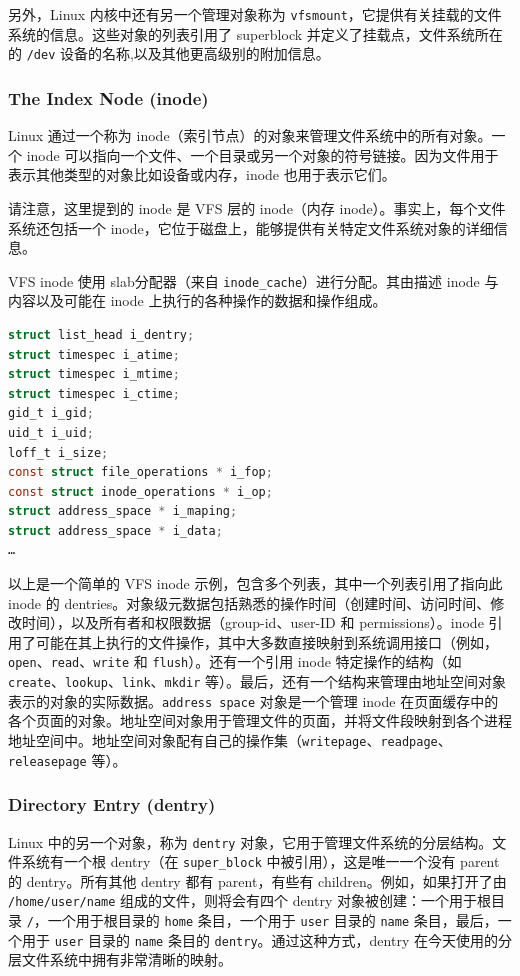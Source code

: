 \documentclass[UTF8,a4paper]{ctexart}
\begin{document}
另外，Linux 内核中还有另一个管理对象称为
\texttt{vfsmount}，它提供有关挂载的文件系统的信息。这些对象的列表引用了
superblock 并定义了挂载点，文件系统所在的 \texttt{/dev}
设备的名称,以及其他更高级别的附加信息。


\subsubsection{The Index Node (inode)}
Linux 通过一个称为
inode（索引节点）的对象来管理文件系统中的所有对象。一个 inode
可以指向一个文件、一个目录或另一个对象的符号链接。因为文件用于表示其他类型的对象比如设备或内存，inode
也用于表示它们。

请注意，这里提到的 inode 是 VFS 层的 inode（内存
inode）。事实上，每个文件系统还包括一个
inode，它位于磁盘上，能够提供有关特定文件系统对象的详细信息。

VFS inode 使用
slab分配器（来自 \texttt{inode\_cache}）进行分配。其由描述 inode
与内容以及可能在 inode 上执行的各种操作的数据和操作组成。

\begin{lstlisting}[language=C]
struct list_head i_dentry;
struct timespec i_atime;
struct timespec i_mtime;
struct timespec i_ctime;
gid_t i_gid;
uid_t i_uid;
loff_t i_size;
const struct file_operations * i_fop;
const struct inode_operations * i_op;
struct address_space * i_maping;
struct address_space * i_data;
…
\end{lstlisting}

以上是一个简单的 VFS inode 示例，包含多个列表，其中一个列表引用了指向此
inode 的
dentries。对象级元数据包括熟悉的操作时间（创建时间、访问时间、修改时间），以及所有者和权限数据（group-id、user-ID
和 permissions）。inode
引用了可能在其上执行的文件操作，其中大多数直接映射到系统调用接口（例如，\texttt{open}、\texttt{read}、\texttt{write}
和 \texttt{flush}）。还有一个引用 inode 特定操作的结构（如
\texttt{create}、\texttt{lookup}、\texttt{link}、\texttt{mkdir}
等）。最后，还有一个结构来管理由地址空间对象表示的对象的实际数据。\texttt{address\ space}
对象是一个管理 inode
在页面缓存中的各个页面的对象。地址空间对象用于管理文件的页面，并将文件段映射到各个进程地址空间中。地址空间对象配有自己的操作集（\texttt{writepage}、\texttt{readpage}、\texttt{releasepage}
等）。

\subsubsection{Directory Entry (dentry)}

Linux 中的另一个对象，称为 \texttt{dentry}
对象，它用于管理文件系统的分层结构。文件系统有一个根 dentry（在
\texttt{super\_block} 中被引用），这是唯一一个没有 parent 的
dentry。所有其他 dentry 都有 parent，有些有 children。例如，如果打开了由
\texttt{/home/user/name} 组成的文件，则将会有四个 dentry
对象被创建：一个用于根目录 \texttt{/}，一个用于根目录的 \texttt{home}
条目，一个用于 \texttt{user} 目录的 \texttt{name} 条目，最后，一个用于
\texttt{user} 目录的 \texttt{name} 条目的
\texttt{dentry}。通过这种方式，dentry
在今天使用的分层文件系统中拥有非常清晰的映射。
\end{document}
